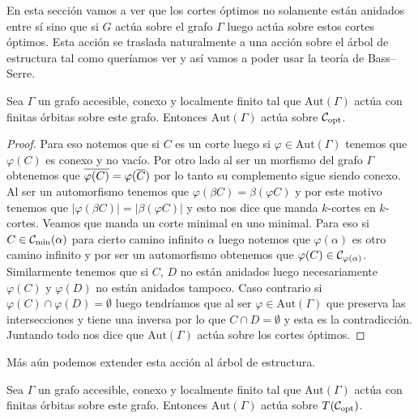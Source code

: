 \documentclass[tesis.tex]{subfiles}
\newcommand{\aut}{\text{Aut}}
\begin{document}
En esta sección vamos a ver que los cortes óptimos no solamente están anidados entre sí sino que si $G$ actúa sobre el grafo $\Gamma$ luego actúa sobre estos cortes óptimos.
Esta acción se traslada naturalmente a una acción sobre el árbol de estructura tal como queríamos ver y así vamos a poder usar la teoría de Bass--Serre.



\begin{prop}
	Sea $\Gamma$ un grafo accesible, conexo y localmente finito tal que $\aut(\Gamma)$ actúa con finitas órbitas sobre este grafo.
	Entonces $\aut(\Gamma)$ actúa sobre ${\cal C}_{\text{opt}}$.
\end{prop}

\begin{proof}
	Para eso notemos que si $C$ es un corte luego si $\varphi \in \aut(\Gamma)$ tenemos que $\varphi(C)$ es conexo y no vacío. 
	Por otro lado al ser un morfismo del grafo $\Gamma$ obtenemos que $\overline{\varphi(C)} = \varphi(\overline C)$ por lo tanto su complemento sigue siendo conexo.
	Al ser un automorfismo tenemos que $\varphi(\beta C) = \beta (\varphi C)$ y por este motivo tenemos que $|\varphi (\beta C)| = |\beta (\varphi C)|$ y esto nos dice que manda $k$-cortes en $k$-cortes.
	Veamos que manda un corte minimal en uno minimal. 
	Para eso si $C \in {{\cal C}}_{\text{min}}(\alpha)$ para cierto camino infinito $\alpha$ luego notemos que $\varphi(\alpha)$ es otro camino infinito y por ser un automorfismo obtenemos que $\varphi(C) \in {\cal C}_{\varphi(\alpha)}$.
	Similarmente tenemos que si $C$, $D$ no están anidados luego necesariamente $\varphi(C)$ y $\varphi(D)$ no están anidados tampoco.
	Caso contrario si $\varphi(C) \cap \varphi(D) = \emptyset$ luego tendríamos que al ser $\varphi \in \aut(\Gamma)$ que preserva las intersecciones y tiene una inversa por lo que $C \cap D = \emptyset$ y esta es la contradicción.
	Juntando todo nos dice que $\aut(\Gamma)$ actúa sobre los cortes óptimos.
	
\end{proof}

Más aún podemos extender esta acción al árbol de estructura.

\begin{coro}
	Sea $\Gamma$ un grafo accesible, conexo y localmente finito tal que $\aut(\Gamma)$ actúa con finitas órbitas sobre este grafo.
	Entonces $\aut(\Gamma)$ actúa sobre $T({\cal C}_{\text{opt}})$.
\end{coro}
\end{document}
